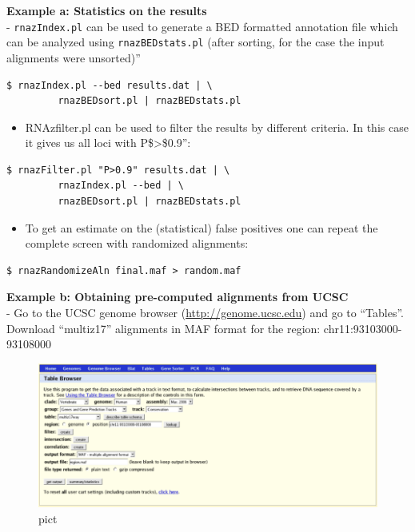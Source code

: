 \documentclass[]{article}
\providecommand{\tightlist}{%
  \setlength{\itemsep}{0pt}\setlength{\parskip}{0pt}}
\begin{document}
\textbf{Example a: Statistics on the results}\\
- \texttt{rnazIndex.pl} can be used to generate a BED formatted
annotation file which can be analyzed using \texttt{rnazBEDstats.pl}
(after sorting, for the case the input alignments were unsorted)''

\begin{verbatim}
$ rnazIndex.pl --bed results.dat | \
         rnazBEDsort.pl | rnazBEDstats.pl
\end{verbatim}

\begin{itemize}
\tightlist
\item
  RNAzfilter.pl can be used to filter the results by different criteria. In
  this case it gives us all loci with P\$\textgreater{}\$0.9'':
\end{itemize}

\begin{verbatim}
$ rnazFilter.pl "P>0.9" results.dat | \
         rnazIndex.pl --bed | \
         rnazBEDsort.pl | rnazBEDstats.pl
\end{verbatim}

\begin{itemize}
\tightlist
\item
  To get an estimate on the (statistical) false positives one can repeat
  the complete screen with randomized alignments:
\end{itemize}

\begin{verbatim}
$ rnazRandomizeAln final.maf > random.maf
\end{verbatim}

\textbf{Example b: Obtaining pre-computed alignments from UCSC}\\
- Go to the UCSC genome browser
(\href{http://genome.ucsc.edu/}{http://genome.ucsc.edu}) and go to
``Tables''. Download ``multiz17'' alignments in MAF format for the
region: chr11:93103000-93108000

\begin{figure}[htbp]
\centering
\includegraphics{Figs/table-browser.png}
\caption{pict}
\end{figure}
\end{document}
